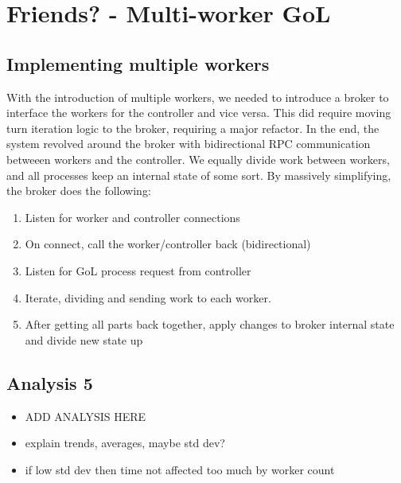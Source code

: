 \documentclass[twoside,twocolumn]{article}
\begin{document}
\section{Friends? - Multi-worker GoL}
\subsection{Implementing multiple workers}
With the introduction of multiple workers, we needed to introduce a broker to interface the workers for the controller
and vice versa. This did require moving turn iteration logic to the broker, requiring a major refactor. In the end, the system
revolved around the broker with bidirectional RPC communication betweeen workers and the controller. We equally divide work
between workers, and all processes keep an internal state of some sort. By massively simplifying, the broker does the following:

\begin{enumerate}[noitemsep]
  \item Listen for worker and controller connections
  \item On connect, call the worker/controller back (bidirectional)
  \item Listen for GoL process request from controller
  \item Iterate, dividing and sending work to each worker.
  \item After getting all parts back together, apply changes to broker internal state and divide new state up
\end{enumerate}
\subsection{Analysis 5}
\begin{itemize}
  \item ADD ANALYSIS HERE
  \item explain trends, averages, maybe std dev?
  \item if low std dev then time not affected too much by worker count
\end{itemize}
\end{document}
